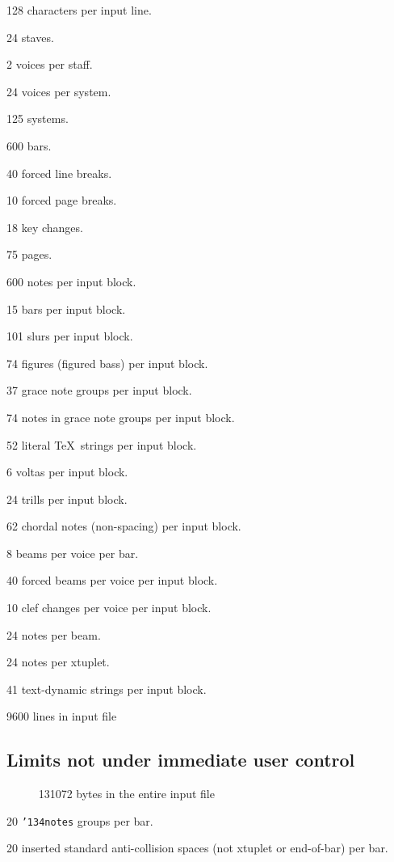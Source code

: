 \documentclass[11pt]{article}
\def\bs{{\tt\char'134}}
\def\newfrom{2.59}  %
\def\NEW#1{\ifdim#1 pt<\newfrom pt\else%
\marginpar{\fbox{#1}}\fi}
\begin{document}
128 characters per input line.

24 \NEW{2.6} staves.

2 voices per staff.

24 \NEW{2.6} voices per system.

125 systems.

600 bars.

40 forced line breaks.

10 forced page breaks.

18 key changes.

75 \NEW{2.78} pages.

600 \NEW{2.6} notes per input block.

15 bars per input block.

101 slurs per input block. 

74 figures (figured bass) per input block.

37 grace note groups per input block.

74 notes in grace note groups per input block.

52 literal \TeX\ strings per input block.

6 voltas per input block.

24 \NEW{2.6} trills per input block.

62 chordal notes (non-spacing) per input block.

8 beams per voice per bar.

40 \NEW{2.5}forced beams per voice per input block.

10 clef changes per voice per input block.

24 notes per beam.

24 notes per xtuplet.

41 text-dynamic strings per input block.\NEW{2.5}

9600 \NEW{2.78} lines in input file

\subsection{Limits not under immediate user control}

%
\ \ \ \ \ \kern6pt 131072 \NEW{2.78} bytes in the entire input file

20 \bs{\tt notes} groups per bar.

20 inserted standard anti-collision spaces (not xtuplet or end-of-bar) per bar.
\end{document}
